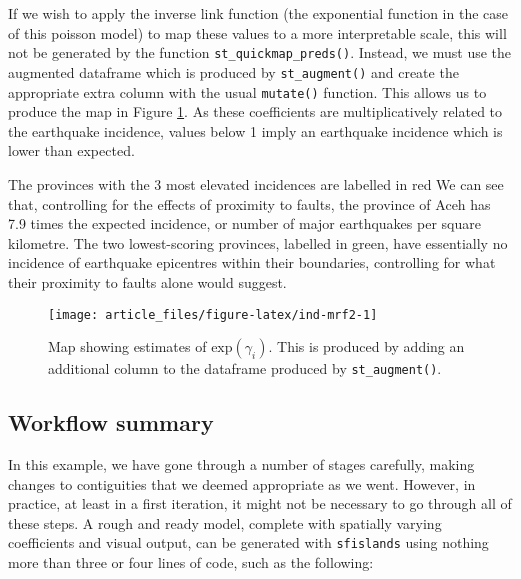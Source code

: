 If we wish to apply the inverse link function (the exponential function in the case of this poisson model) to map these values to a more interpretable scale, this will not be generated by the function \texttt{st\_quickmap\_preds()}. Instead, we must use the augmented dataframe which is produced by \texttt{st\_augment()} and create the appropriate extra column with the usual  \texttt{mutate()} function. This allows us to produce the map in Figure
\ref{fig:ind-mrf2}. As these coefficients are multiplicatively related
to the earthquake incidence, values below 1 imply an earthquake
incidence which is lower than expected.

The provinces with the 3 most elevated incidences are labelled in red
We can see that, controlling for the effects of proximity to
faults, the province of Aceh has 7.9 times the expected
incidence, or number of major earthquakes per square kilometre. The two
lowest-scoring provinces, labelled in green, have essentially no incidence of
earthquake epicentres within their boundaries, controlling for what their proximity to faults alone would
suggest.



\begin{figure}

{\centering \texttt{[image: article\_files/figure-latex/ind-mrf2-1]} 

}

\caption{Map showing estimates of \(\text{exp}(\gamma_i).\) This is produced by adding an additional column to the dataframe produced by \texttt{st\_augment()}.}\label{fig:ind-mrf2}
\end{figure}

\hypertarget{workflow-summary}{%
\subsection{Workflow summary}\label{workflow-summary}}

In this example, we have gone through a number of stages carefully, making changes to contiguities that we deemed appropriate as we went. However, in practice, at least in a first iteration, it might not be necessary to go through all of these steps. A rough and ready model, complete with spatially varying coefficients and visual output, can be generated with \texttt{sfislands} using nothing more than three or four lines of code, such as the following:

